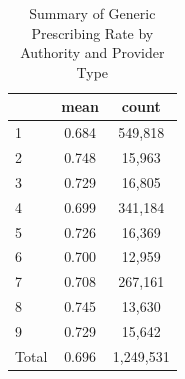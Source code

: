 \begin{table}[htbp]\centering
\def\sym#1{\ifmmode^{#1}\else\(^{#1}\)\fi}
\caption{Summary of Generic Prescribing Rate by Authority and Provider Type}
\begin{tabular}{l*{1}{cc}}
\toprule
                    &        mean&       count\\
\midrule
1                   &       0.684&     549,818\\
2                   &       0.748&      15,963\\
3                   &       0.729&      16,805\\
4                   &       0.699&     341,184\\
5                   &       0.726&      16,369\\
6                   &       0.700&      12,959\\
7                   &       0.708&     267,161\\
8                   &       0.745&      13,630\\
9                   &       0.729&      15,642\\
Total               &       0.696&   1,249,531\\
\bottomrule
\end{tabular}
\end{table}
